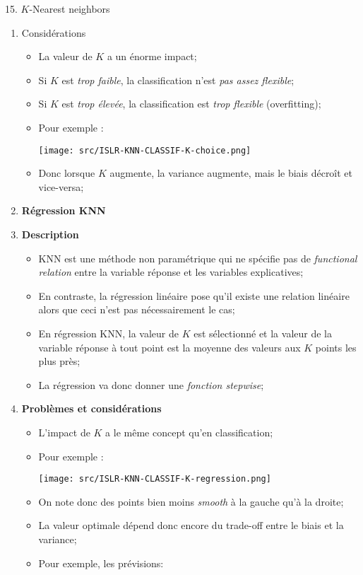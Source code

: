 \documentclass[12pt, titlepage, french]{report}
\begin{document}
\begin{CHPT_SUMM}[label = {PCA-KNN}]{15. $K$-Nearest neighbors}
\begin{enumerate}
\begin{enumerate}[label = \roman*.]
		\end{enumerate}
	\item[]	Considérations
		\begin{itemize}
		\item	La valeur de $K$ a un énorme impact;
		\item[]	Si $K$ est \textit{trop faible}, la classification n'est \textit{pas assez flexible};
		\item[]	Si $K$ est \textit{trop élevée}, la classification est \textit{trop flexible} (overfitting);
		\item	Pour exemple :
		
		\texttt{[image: src/ISLR-KNN-CLASSIF-K-choice.png]}
		\item	Donc lorsque $K$ augmente, la variance augmente, mais le biais décroît et vice-versa;	
		\end{itemize}
	\item	\textbf{Régression KNN}
	\item[]	\textbf{Description}
		\begin{itemize}
		\item	KNN est une méthode non paramétrique qui ne spécifie pas de \textit{functional relation} entre la variable réponse et les variables explicatives;
		\item[]	En contraste, la régression linéaire pose qu'il existe une relation linéaire alors que ceci n'est pas nécessairement le cas;
		\item	En régression KNN, la valeur de $K$ est sélectionné et la valeur de la variable réponse à tout point est la moyenne des valeurs aux $K$ points les plus près;
		\item	La régression va donc donner une \textit{fonction stepwise};
		\end{itemize}
	\item[]	\textbf{Problèmes et considérations}
		\begin{itemize}
		\item	L'impact de $K$ a le même concept qu'en classification;
		\item	Pour exemple : 
		
		\texttt{[image: src/ISLR-KNN-CLASSIF-K-regression.png]}\label{fig:KNN-3D}
		\item[]	On note donc des points bien moins \textit{smooth} à la gauche qu'à la droite;
		\item[]	La valeur optimale dépend donc encore du trade-off entre le biais et la variance;
		\item	Pour exemple, les prévisions:
		

\end{itemize}
\end{enumerate}
\end{CHPT_SUMM}
\end{document}
